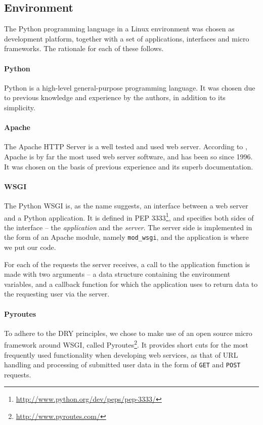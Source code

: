 \documentclass[pdftex,english,10pt,b5paper,twoside]{book}
\begin{document}
\subsection{Environment}

The Python programming language in a Linux environment was chosen as development
platform, together with a set of applications, interfaces and micro frameworks.
The rationale for each of these follows.

\paragraph{Python} Python is a high-level general-purpose programming language.
It was chosen due to previous knowledge and experience by the
authors, in addition to its simplicity.

\paragraph{Apache} The Apache HTTP Server is a well tested and used web
server. According to \citet{netcraft}, Apache is by far the most used web server
software, and has been so since 1996. It was chosen on the basis of previous
experience and its superb documentation.

\paragraph{\acs{WSGI}} The Python \ac{WSGI} is, as the name suggests, an
interface between a web server and a Python application. It is defined in
\ac{PEP} 3333\footnote{\url{http://www.python.org/dev/peps/pep-3333/}}, and
specifies both sides of the interface -- the \emph{application} and the
\emph{server}. The server side is implemented in the form of an Apache
module, namely \texttt{mod\_wsgi}, and the application is where we put our
code.

For each of the requests the server receives, a call
to the application function is made with two arguments -- a data structure
containing the environment variables, and a callback function for which the
application uses to return data to the requesting user via the server.

\paragraph{Pyroutes} To adhere to the \ac{DRY} principles, we chose to make use
of an open source micro framework around \ac{WSGI}, called
Pyroutes\footnote{\url{http://www.pyroutes.com/}}. It provides short cuts for the
most frequently used functionality when developing web services, as that of
\ac{URL} handling and processing of submitted user data in the form of
\texttt{GET} and \texttt{POST} requests.
\end{document}
